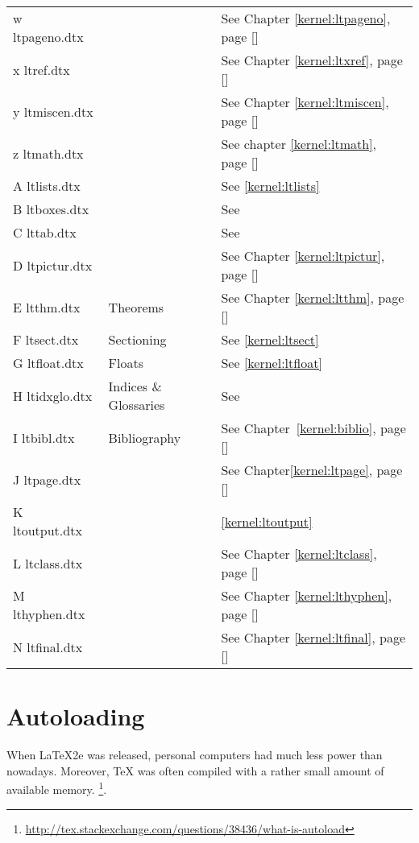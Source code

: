 \begin{longtable}{llp{5cm}}
w ltpageno.dtx    && See Chapter \ref{kernel:ltpageno}, page [\pageref{kernel:ltpageno}]\\
x ltref.dtx       && See Chapter \ref{kernel:ltxref}, page [\pageref{kernel:ltxref}] \\
y ltmiscen.dtx    && See Chapter \ref{kernel:ltmiscen}, page [\pageref{kernel:ltmiscen}]\\
z ltmath.dtx      && See chapter \ref{kernel:ltmath}, page [\pageref{kernel:ltmath}]\\
A ltlists.dtx     && See \ref{kernel:ltlists}\\
B ltboxes.dtx     && See \pageref{kernel:ltboxes}\\
C lttab.dtx       && See \pageref{kernel:lttab}\\
D ltpictur.dtx    && See Chapter \ref{kernel:ltpictur}, page [\pageref{kernel:ltpictur}]\\
E ltthm.dtx       &Theorems& See Chapter \ref{kernel:ltthm}, page [\pageref{kernel:ltthm}]\\
F ltsect.dtx      &Sectioning& See \ref{kernel:ltsect} \\
G ltfloat.dtx     &Floats& See \ref{kernel:ltfloat}\\
H ltidxglo.dtx    &Indices \& Glossaries& See \pageref{kernel:ltidxglo}\\
I ltbibl.dtx      &Bibliography & See Chapter~\ref{kernel:biblio}, page [\pageref{kernel:biblio}]\\
J ltpage.dtx      && See Chapter\ref{kernel:ltpage}, page [\pageref{kernel:ltpage}]\\
K ltoutput.dtx    && \ref{kernel:ltoutput}\\
L ltclass.dtx     && See Chapter \ref{kernel:ltclass}, page [\pageref{kernel:ltclass}]\\
M lthyphen.dtx    && See Chapter \ref{kernel:lthyphen}, page [\pageref{kernel:lthyphen}]\\
N ltfinal.dtx     && See Chapter \ref{kernel:ltfinal}, page [\pageref{kernel:ltfinal}]\\
\bottomrule
\end{longtable}


\section{Autoloading}

When LaTeX2e was released, personal computers had much less power than nowadays. Moreover, TeX was often compiled with a rather small amount of available memory.
\footnote{\url{http://tex.stackexchange.com/questions/38436/what-is-autoload}}.

